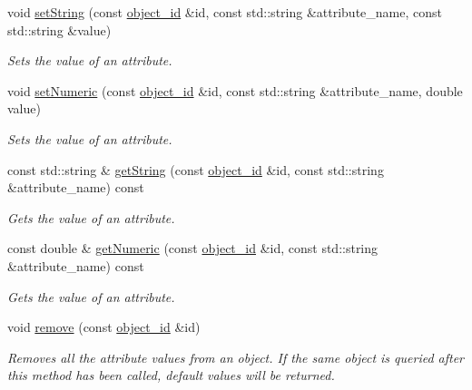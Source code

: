 \begin{DoxyCompactItemize}
void \hyperlink{classmlnet_1_1_attribute_store_a85f3fb59c476b2aeeeaee746fb9cb479}{set\+String} (const \hyperlink{namespacemlnet_a318fc9bfdb74e1da4d44d0c50d4a453d}{object\+\_\+id} \&id, const std\+::string \&attribute\+\_\+name, const std\+::string \&value)
\begin{DoxyCompactList}\small\item\em Sets the value of an attribute. \end{DoxyCompactList}\item 
void \hyperlink{classmlnet_1_1_attribute_store_a52c771c75c90c6d6a18a176d7c57d50e}{set\+Numeric} (const \hyperlink{namespacemlnet_a318fc9bfdb74e1da4d44d0c50d4a453d}{object\+\_\+id} \&id, const std\+::string \&attribute\+\_\+name, double value)
\begin{DoxyCompactList}\small\item\em Sets the value of an attribute. \end{DoxyCompactList}\item 
const std\+::string \& \hyperlink{classmlnet_1_1_attribute_store_acf03c80e6a33425ab4d61948bdd35c75}{get\+String} (const \hyperlink{namespacemlnet_a318fc9bfdb74e1da4d44d0c50d4a453d}{object\+\_\+id} \&id, const std\+::string \&attribute\+\_\+name) const 
\begin{DoxyCompactList}\small\item\em Gets the value of an attribute. \end{DoxyCompactList}\item 
const double \& \hyperlink{classmlnet_1_1_attribute_store_a42d014eb8df0be3bab9729bc906f650a}{get\+Numeric} (const \hyperlink{namespacemlnet_a318fc9bfdb74e1da4d44d0c50d4a453d}{object\+\_\+id} \&id, const std\+::string \&attribute\+\_\+name) const 
\begin{DoxyCompactList}\small\item\em Gets the value of an attribute. \end{DoxyCompactList}\item 
void \hyperlink{classmlnet_1_1_attribute_store_ad2f9528fdd74c4afcbcf50a03e320954}{remove} (const \hyperlink{namespacemlnet_a318fc9bfdb74e1da4d44d0c50d4a453d}{object\+\_\+id} \&id)
\begin{DoxyCompactList}\small\item\em Removes all the attribute values from an object. If the same object is queried after this method has been called, default values will be returned. \end{DoxyCompactList}\end{DoxyCompactItemize}
